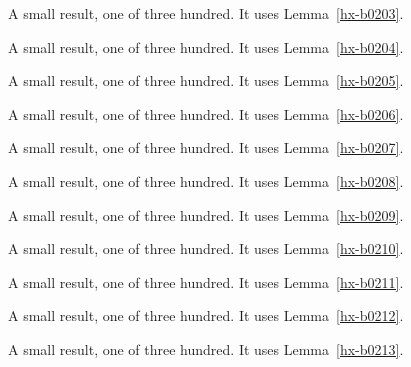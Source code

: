 \begin{lemma}[Bulk 204]\label{hx-b0204}
A small result, one of three hundred. It uses Lemma~\ref{hx-b0203}.
\end{lemma}

\begin{lemma}[Bulk 205]\label{hx-b0205}
A small result, one of three hundred. It uses Lemma~\ref{hx-b0204}.
\end{lemma}

\begin{lemma}[Bulk 206]\label{hx-b0206}
A small result, one of three hundred. It uses Lemma~\ref{hx-b0205}.
\end{lemma}

\begin{lemma}[Bulk 207]\label{hx-b0207}
A small result, one of three hundred. It uses Lemma~\ref{hx-b0206}.
\end{lemma}

\begin{lemma}[Bulk 208]\label{hx-b0208}
A small result, one of three hundred. It uses Lemma~\ref{hx-b0207}.
\end{lemma}

\begin{lemma}[Bulk 209]\label{hx-b0209}
A small result, one of three hundred. It uses Lemma~\ref{hx-b0208}.
\end{lemma}

\begin{lemma}[Bulk 210]\label{hx-b0210}
A small result, one of three hundred. It uses Lemma~\ref{hx-b0209}.
\end{lemma}

\begin{lemma}[Bulk 211]\label{hx-b0211}
A small result, one of three hundred. It uses Lemma~\ref{hx-b0210}.
\end{lemma}

\begin{lemma}[Bulk 212]\label{hx-b0212}
A small result, one of three hundred. It uses Lemma~\ref{hx-b0211}.
\end{lemma}

\begin{lemma}[Bulk 213]\label{hx-b0213}
A small result, one of three hundred. It uses Lemma~\ref{hx-b0212}.
\end{lemma}

\begin{lemma}[Bulk 214]\label{hx-b0214}
A small result, one of three hundred. It uses Lemma~\ref{hx-b0213}.
\end{lemma}

